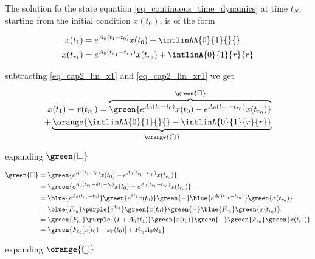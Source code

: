 
The solution fo the state equation \eqref{eq_continuous_time_dynamics} at time $t_N$, starting from the initial condition $x(t_0)$, is of the form

\begin{align}
	\label{eq_cap2_lin_x1}
	x(t_1)  &= e^{A_0(t_1-t_0)}x(t_0) + \intlinAA{0}{1}{}{} \\
	\label{eq_cap2_lin_xr1}
	x(t_{r_1}) &= e^{A_0(t_{r_1}-t_{r_0})}x(t_{r_0}) + \intlinA{0}{1}{r}{r}
\end{align}

subtracting \eqref{eq_cap2_lin_x1} and \eqref{eq_cap2_lin_xr1} we get

\begin{equation}
	\label{eq_cap2_lin_erro_x0x1}
	\begin{split}
		x(t_1) - x(t_{r_1}) = \overbrace{\green{e^{A_0(t_1-t_0)}x(t_0) - e^{A_0(t_{r_1}-t_{r_0})}x(t_{r_0})}}^{\green{\square}} \\
		+ \underbrace{\orange{\intlinAA{0}{1}{}{} - \intlinA{0}{1}{r}{r}}}_{\orange{\bigcirc}}
	\end{split}
\end{equation}

expanding $\green{\square}$

\begin{align}
  \green{\square} &= \green{e^{A_0(t_1-t_0)}x(t_0) - e^{A_0(t_{r_1}-t_{r_0})}x(t_{r_0})} \nonumber \\
				  &= \green{e^{A_0(t_{r_1} + \delta t_1 - t_0)}x(t_0) - e^{A_0(t_{r_1}-t_{r_0})}x(t_{r_0})} \nonumber \\
				  &= \blue{e^{A_0(t_{r_1} - t_0)}} \green{e^{\delta t_1} x(t_0)} \green{-} \blue{e^{A_0(t_{r_1}-t_{r_0})}}\green{x(t_{r_0})} \nonumber \\
				  &= \blue{F_{r_0}} \purple{e^{\delta t_1}} \green{x(t_0)} \green{-} \blue{F_{r_0}}\green{x(t_{r_0})} \nonumber \\
				  &= \green{F_{r_0}} \purple{(I + A_0 \delta t_1)} \green{x(t_0)} \green{-} \green{F_{r_0}}\green{x(t_{r_0})} \nonumber \\ 
				  \label{eq_cap2_lin_erro_x0x1_green}
				  &= \green{F_{r_0} [x(t_0) - x_r(t_0)] + F_{r_0} A_0 \delta t_1}
\end{align}

expanding $\orange{\bigcirc}$

